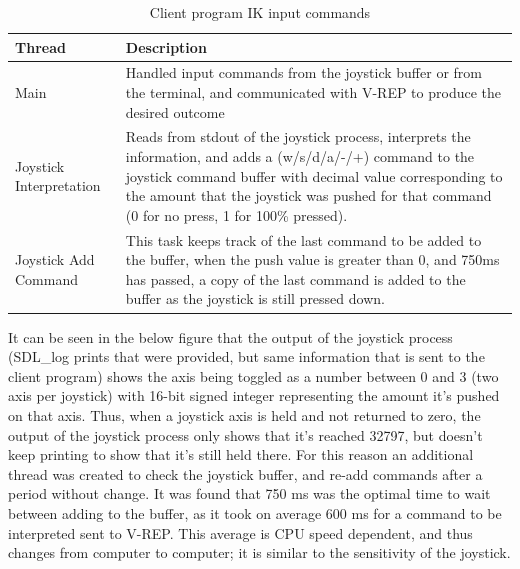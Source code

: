 \documentclass[12pt,openany,a4paper]{book}
\begin{document}
\begin{center}
\begin{table}[htb]
    
    \begin{tabular}{| l | p{10cm} |}
    \hline
     Thread & Description     \\
     \hline
     Main & Handled input commands from the joystick buffer or from the terminal, and communicated with V-REP to produce the desired outcome  \\
     \hline 
     Joystick Interpretation & Reads from stdout of the joystick process, interprets the information, and adds a (w/s/d/a/-/+) command to the joystick command buffer with decimal value corresponding to the amount that the joystick was pushed for that command (0 for no press, 1 for 100\% pressed).\\
     \hline
     Joystick Add Command & This task keeps track of the last command to be added to the buffer, when the push value is greater than 0, and 750ms has passed, a copy of the last command is added to the buffer as the joystick is still pressed down. \\ \hline
    \end{tabular}
    \caption{Client program IK input commands}
\end{table}
\end{center}


It can be seen in the below figure that the output of the joystick process (SDL\_log prints that were provided, but same information that is sent to the client program) shows the axis being toggled as a number between 0 and 3 (two axis per joystick) with 16-bit signed integer representing the amount it's pushed on that axis. Thus, when a joystick axis is held and not returned to zero, the output of the joystick process only shows that it's reached 32797, but doesn't keep printing to show that it's still held there. For this reason an additional thread was created to check the joystick buffer, and re-add commands after a period without change. It was found that 750 ms was the optimal time to wait between adding to the buffer, as it took on average 600 ms for a command to be interpreted sent to V-REP. This average is CPU speed dependent, and thus changes from computer to computer; it is similar to the sensitivity of the joystick.
\end{document}
